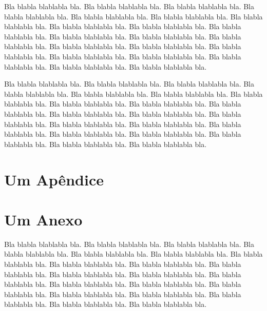 \documentclass[diss,capa]{texufpel}
\begin{document}
Bla blabla blablabla bla.  Bla blabla blablabla bla.  Bla blabla
blablabla bla.  Bla blabla blablabla bla.  Bla blabla blablabla bla.
Bla blabla blablabla bla.  Bla blabla blablabla bla.  Bla blabla
blablabla bla.  Bla blabla blablabla bla.  Bla blabla blablabla bla.
Bla blabla blablabla bla.  Bla blabla blablabla bla.  Bla blabla
blablabla bla.  Bla blabla blablabla bla.  Bla blabla blablabla bla.
Bla blabla blablabla bla.  Bla blabla blablabla bla.  Bla blabla
blablabla bla.  Bla blabla blablabla bla.  Bla blabla blablabla bla.
Bla blabla blablabla bla.

Bla blabla blablabla bla.  Bla blabla blablabla bla.  Bla blabla
blablabla bla.  Bla blabla blablabla bla.  Bla blabla blablabla bla.
Bla blabla blablabla bla.  Bla blabla blablabla bla.  Bla blabla
blablabla bla.  Bla blabla blablabla bla.  Bla blabla blablabla bla.
Bla blabla blablabla bla.  Bla blabla blablabla bla.  Bla blabla
blablabla bla.  Bla blabla blablabla bla.  Bla blabla blablabla bla.
Bla blabla blablabla bla.  Bla blabla blablabla bla.  Bla blabla
blablabla bla.  Bla blabla blablabla bla.  Bla blabla blablabla bla.
Bla blabla blablabla bla.



 

\apendices
\chapter{Um Apêndice}

\anexos
\chapter{Um Anexo}

Bla blabla blablabla bla.  Bla blabla blablabla bla.  Bla blabla
blablabla bla.  Bla blabla blablabla bla.  Bla blabla blablabla bla.
Bla blabla blablabla bla.  Bla blabla blablabla bla.  Bla blabla
blablabla bla.  Bla blabla blablabla bla.  Bla blabla blablabla bla.
Bla blabla blablabla bla.  Bla blabla blablabla bla.  Bla blabla
blablabla bla.  Bla blabla blablabla bla.  Bla blabla blablabla bla.
Bla blabla blablabla bla.  Bla blabla blablabla bla.  Bla blabla
blablabla bla.  Bla blabla blablabla bla.  Bla blabla blablabla bla.
Bla blabla blablabla bla.
\end{document}
